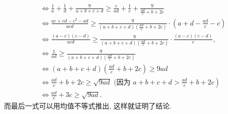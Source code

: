 $$
\begin{aligned}
& \Leftrightarrow \frac{1}{a}+\frac{1}{d}+\frac{9}{a+b+c+d} \geqslant \frac{c}{a d}+\frac{1}{c}+\frac{9}{\frac{a d}{c}+b+2 c} \\
& \Leftrightarrow \frac{a c+c d-c^2-a d}{a c d} \geqslant \frac{9}{(a+b+c+d)\left(\frac{a d}{c}+b+2 c\right)} \cdot\left(a+d-\frac{a d}{c}-c\right) \\
& \Leftrightarrow \frac{(a-c)(c-d)}{a c d} \geqslant \frac{9}{(a+b+c+d)\left(\frac{a d}{c}+b+2 c\right)} \cdot \frac{(a-c)(c-d)}{c}, \\
& \Leftrightarrow \frac{1}{a d} \geqslant \frac{9}{(a+b+c+d)\left(\frac{a d}{c}+b+2 c\right)} \\
& \Leftrightarrow(a+b+c+d)\left(\frac{a d}{c}+b+2 c\right) \geqslant 9 a d \\
&\left.\Leftrightarrow \frac{a d}{c}+b+2 c \geqslant \sqrt{9 a d} \text { (因为 } a+b+c+d>\frac{a d}{c}+b+2 c\right) \\
& \Leftrightarrow \frac{a d}{c}+3 c \geqslant \sqrt{9 a d} .
\end{aligned}
$$
而最后一式可以用均值不等式推出, 这样就证明了结论.



